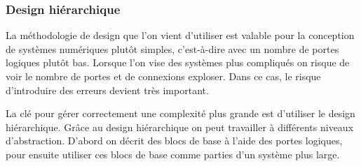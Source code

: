 \subsubsection{Design hiérarchique}
La méthodologie de design que l'on vient d'utiliser est valable pour la conception de systèmes numériques plutôt
simples, c'est-à-dire avec un nombre de portes logiques plutôt bas. Lorsque l'on vise des systèmes plus compliqués on
risque de voir le nombre de portes et de connexions exploser. Dans ce cas, le risque d'introduire des erreurs devient
très important.

La clé pour gérer correctement une complexité plus grande est d'utiliser le design hiérarchique. Grâce au design
hiérarchique on peut travailler à différents niveaux d'abstraction. D'abord on décrit des blocs de base à l'aide des
portes logiques, pour ensuite utiliser ces blocs de base comme parties d'un système plus large.

